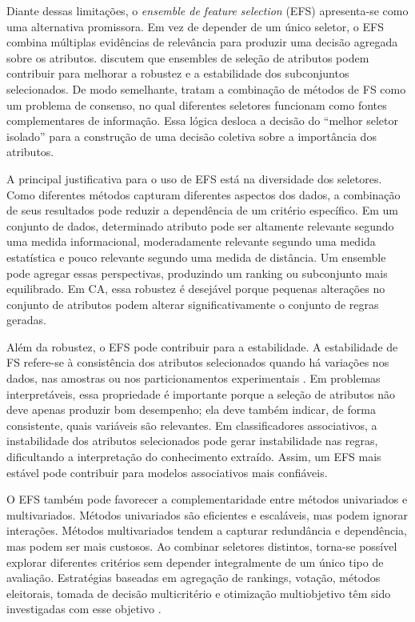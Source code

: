 Diante dessas limitações, o \textit{ensemble de feature selection} (EFS) apresenta-se como uma alternativa promissora. Em vez de depender de um único seletor, o EFS combina múltiplas evidências de relevância para produzir uma decisão agregada sobre os atributos.  discutem que ensembles de seleção de atributos podem contribuir para melhorar a robustez e a estabilidade dos subconjuntos selecionados. De modo semelhante,  tratam a combinação de métodos de FS como um problema de consenso, no qual diferentes seletores funcionam como fontes complementares de informação. Essa lógica desloca a decisão do ``melhor seletor isolado'' para a construção de uma decisão coletiva sobre a importância dos atributos.

A principal justificativa para o uso de EFS está na diversidade dos seletores. Como diferentes métodos capturam diferentes aspectos dos dados, a combinação de seus resultados pode reduzir a dependência de um critério específico. Em um conjunto de dados, determinado atributo pode ser altamente relevante segundo uma medida informacional, moderadamente relevante segundo uma medida estatística e pouco relevante segundo uma medida de distância. Um ensemble pode agregar essas perspectivas, produzindo um ranking ou subconjunto mais equilibrado. Em CA, essa robustez é desejável porque pequenas alterações no conjunto de atributos podem alterar significativamente o conjunto de regras geradas.

Além da robustez, o EFS pode contribuir para a estabilidade. A estabilidade de FS refere-se à consistência dos atributos selecionados quando há variações nos dados, nas amostras ou nos particionamentos experimentais \cite{KHAIRE20221060,BARBIERI2024123667}. Em problemas interpretáveis, essa propriedade é importante porque a seleção de atributos não deve apenas produzir bom desempenho; ela deve também indicar, de forma consistente, quais variáveis são relevantes. Em classificadores associativos, a instabilidade dos atributos selecionados pode gerar instabilidade nas regras, dificultando a interpretação do conhecimento extraído. Assim, um EFS mais estável pode contribuir para modelos associativos mais confiáveis.

O EFS também pode favorecer a complementaridade entre métodos univariados e multivariados. Métodos univariados são eficientes e escaláveis, mas podem ignorar interações. Métodos multivariados tendem a capturar redundância e dependência, mas podem ser mais custosos. Ao combinar seletores distintos, torna-se possível explorar diferentes critérios sem depender integralmente de um único tipo de avaliação. Estratégias baseadas em agregação de rankings, votação, métodos eleitorais, tomada de decisão multicritério e otimização multiobjetivo têm sido investigadas com esse objetivo \cite{drotar2019ensemble,hashemi2021pareto,abellana2022ensemble,kaur2023mcdm,abasabadi2021automatic}.

